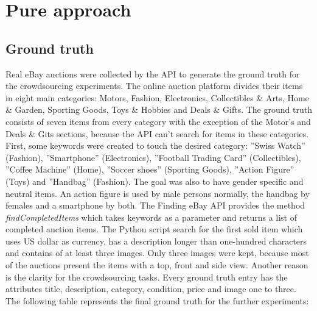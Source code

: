 \section{Pure approach}

\subsection{Ground truth}
Real eBay auctions were collected by the API to generate the ground truth for the crowdsourcing experiments. The online auction platform divides their items in eight main categories: Motors, Fashion, Electronics, Collectibles \& Arts, Home \& Garden, Sporting Goods, Toys \& Hobbies and Deals \& Gifts. The ground truth consists of seven items from every category with the exception of the Motor's and Deals \& Gits sections, because the API can't search for items in these categories. First, some keywords were created to touch the desired category: ''Swiss Watch'' (Fashion), ''Smartphone'' (Electronics), ''Football Trading Card'' (Collectibles), ''Coffee Machine'' (Home), ''Soccer shoes'' (Sporting Goods), ''Action Figure'' (Toys) and ''Handbag'' (Fashion). The goal was also to have gender specific and neutral items. An action figure is used by male persons normally, the handbag by females and a smartphone by both. The Finding eBay API provides the method \textit{findCompletedItems} which takes keywords as a parameter and returns a list of completed auction items. The Python script search for the first sold item which uses US dollar as currency, has a description longer than one-hundred characters and contains of at least three images. Only three images were kept, because most of the auctions present the items with a top, front and side view. Another reason is the clarity for the crowdsourcing tasks. Every ground truth entry has the attributes title, description, category, condition, price and image one to three. The following table represents the final ground truth for the further experiments:

